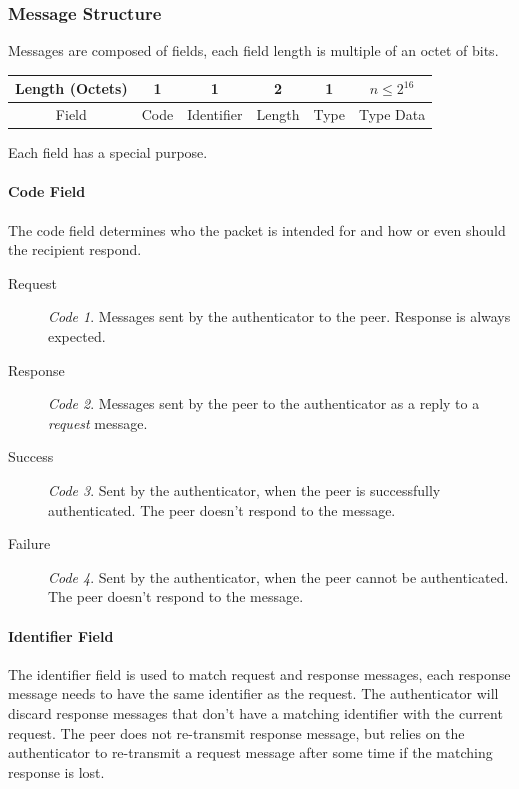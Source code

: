 \subsubsection{Message Structure}
Messages are composed of fields, each field length is multiple of an octet of bits.

\begin{center}
	\begin{tabular}{|c|c|c|c|c|c|}
		\hline
		Length (Octets) & 1 & 1 & 2 & 1 & $n \le 2^{16}$\\
		\hline
		Field & Code & Identifier & Length & Type & Type Data\\
		\hline
	\end{tabular}
\end{center}

Each field has a special purpose.


\paragraph{Code Field}
The code field determines who the packet is intended for and how or even should the recipient respond.

\begin{description}
	\item[Request]\textit{Code 1}. Messages sent by the authenticator to the peer. Response is always expected.
	\item[Response]\textit{Code 2}. Messages sent by the peer to the authenticator as a reply to a \textit{request} message.
	\item[Success]\textit{Code 3}. Sent by the authenticator, when the peer is successfully authenticated. The peer doesn't respond to the message.
	\item[Failure]\textit{Code 4}. Sent by the authenticator, when the peer cannot be authenticated. The peer doesn't respond to the message.
\end{description}

\medskip
\paragraph{Identifier Field}
The identifier field is used to match request and response messages, each response message needs to have the same identifier as the request.
The authenticator will discard response messages that don't have a matching identifier with the current request.
The peer does not re-transmit response message, but relies on the authenticator to re-transmit a request message after some time if the matching response is lost.
\medskip

